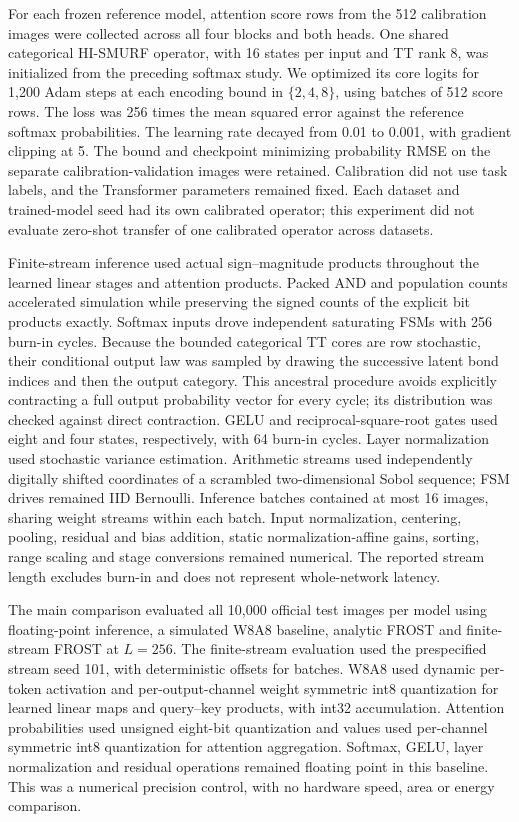 For each frozen reference model, attention score rows from the 512
calibration images were collected across all four blocks and both heads.
One shared categorical HI-SMURF operator, with 16 states per input and
TT rank 8, was initialized from the preceding softmax study. We optimized
its core logits for 1,200 Adam steps at each encoding bound in
$\{2,4,8\}$, using batches of 512 score rows. The loss was 256 times the
mean squared error against the reference softmax probabilities. The
learning rate decayed from 0.01 to 0.001, with gradient clipping at 5.
The bound and checkpoint minimizing probability RMSE on the separate
calibration-validation images were retained. Calibration did not use task
labels, and the Transformer parameters remained fixed. Each dataset and
trained-model seed had its own calibrated operator; this experiment did
not evaluate zero-shot transfer of one calibrated operator across datasets.

Finite-stream inference used actual sign--magnitude products throughout
the learned linear stages and attention products. Packed AND and population
counts accelerated simulation while preserving the signed counts of the
explicit bit products exactly. Softmax inputs drove independent saturating
FSMs with 256 burn-in cycles. Because the bounded categorical TT cores are
row stochastic, their conditional output law was sampled by drawing the
successive latent bond indices and then the output category. This ancestral
procedure avoids explicitly contracting a full output probability vector
for every cycle; its distribution was checked against direct contraction.
GELU and reciprocal-square-root gates used eight and four states,
respectively, with 64 burn-in cycles. Layer normalization used stochastic
variance estimation. Arithmetic streams used independently digitally
shifted coordinates of a scrambled two-dimensional Sobol sequence; FSM
drives remained IID Bernoulli. Inference batches contained at most 16
images, sharing weight streams within each batch. Input normalization,
centering, pooling, residual and bias addition, static normalization-affine
gains, sorting, range scaling and stage conversions remained numerical.
The reported stream length excludes burn-in and does not represent
whole-network latency.

The main comparison evaluated all 10,000 official test images per model
using floating-point inference, a simulated W8A8 baseline, analytic FROST
and finite-stream FROST at $L=256$. The finite-stream evaluation used the
prespecified stream seed 101, with deterministic offsets for batches. W8A8
used dynamic per-token activation and per-output-channel weight symmetric
int8 quantization for learned linear maps and query--key products, with
int32 accumulation. Attention probabilities used unsigned eight-bit
quantization and values used per-channel symmetric int8 quantization for
attention aggregation. Softmax, GELU, layer normalization and residual
operations remained floating point in this baseline. This was a numerical
precision control, with no hardware speed, area or energy comparison.

